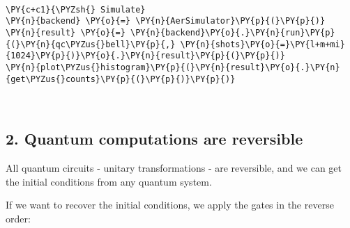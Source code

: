     \begin{center}
    \end{center}
    { \hspace*{\fill} \\}
    

    \begin{tcolorbox}[breakable, size=fbox, boxrule=1pt, pad at break*=1mm,colback=cellbackground, colframe=cellborder]
\begin{Verbatim}[commandchars=\\\{\}]
\PY{c+c1}{\PYZsh{} Simulate}
\PY{n}{backend} \PY{o}{=} \PY{n}{AerSimulator}\PY{p}{(}\PY{p}{)}
\PY{n}{result} \PY{o}{=} \PY{n}{backend}\PY{o}{.}\PY{n}{run}\PY{p}{(}\PY{n}{qc\PYZus{}bell}\PY{p}{,} \PY{n}{shots}\PY{o}{=}\PY{l+m+mi}{1024}\PY{p}{)}\PY{o}{.}\PY{n}{result}\PY{p}{(}\PY{p}{)}
\PY{n}{plot\PYZus{}histogram}\PY{p}{(}\PY{n}{result}\PY{o}{.}\PY{n}{get\PYZus{}counts}\PY{p}{(}\PY{p}{)}\PY{p}{)}
\end{Verbatim}
\end{tcolorbox}
 
            
    
    \begin{center}
    \end{center}
    { \hspace*{\fill} \\}
    

    \hypertarget{quantum-computations-are-reversible}{%
\subsection*{2. Quantum computations are
reversible}\label{quantum-computations-are-reversible}}

All quantum circuits - unitary transformations - are reversible, and we
can get the initial conditions from any quantum system.

If we want to recover the initial conditions, we apply the gates in the
reverse order:

